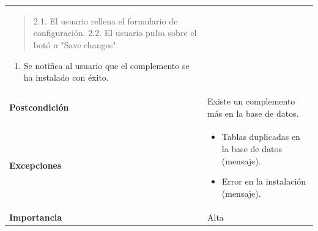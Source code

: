 \documentclass[
]{article}
\providecommand{\tightlist}{%
  \setlength{\itemsep}{0pt}\setlength{\parskip}{0pt}}
\begin{document}
\begin{longtable}[]{@{}ll@{}}
\begin{minipage}[t]{0.71\columnwidth}
\begin{quote}
2.1. El usuario rellena el formulario de configuración. 2.2. El usuario
pulsa sobre el botó n "Save changes".
\end{quote}

\begin{enumerate}
\def\labelenumi{\arabic{enumi}.}
\setcounter{enumi}{2}
\tightlist
\item
  Se notifica al usuario que el complemento se ha instalado con éxito.
\end{enumerate}\strut
\end{minipage}\tabularnewline
\begin{minipage}[t]{0.24\columnwidth}\raggedright
\textbf{Postcondición}\strut
\end{minipage} & \begin{minipage}[t]{0.71\columnwidth}\raggedright
Existe un complemento más en la base de datos.\strut
\end{minipage}\tabularnewline
\begin{minipage}[t]{0.24\columnwidth}\raggedright
\textbf{Excepciones}\strut
\end{minipage} & \begin{minipage}[t]{0.71\columnwidth}\raggedright
\begin{itemize}
\tightlist
\item
  Tablas duplicadas en la base de datos (mensaje).
\item
  Error en la instalación (mensaje).
\end{itemize}\strut
\end{minipage}\tabularnewline
\begin{minipage}[t]{0.24\columnwidth}\raggedright
\textbf{Importancia}\strut
\end{minipage} & \begin{minipage}[t]{0.71\columnwidth}\raggedright
Alta\strut
\end{minipage}\tabularnewline
\bottomrule
\end{longtable}
\end{document}
